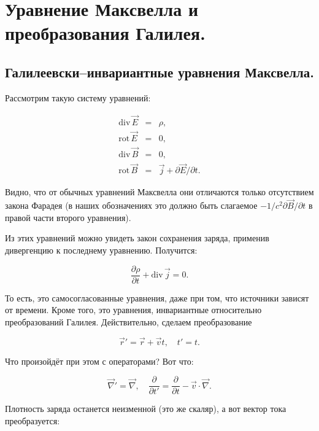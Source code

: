 \documentclass[12pt]{article}
\newcommand{\pt}{\partial}
\newcommand{\rot}{\mathrm{rot}\,}
\renewcommand{\div}{\mathrm{div}\,}
\newcommand{\vn}{\vec{\nabla}}
\begin{document}
\section{Уравнение Максвелла и преобразования Галилея.}
\label{sec:maxwell_galileo}

\subsection{Галилеевски–инвариантные уравнения Максвелла.}
\label{sec:maxwell_inv_gal}

Рассмотрим такую систему уравнений: 

\begin{eqnarray}
  \label{eq:maxwell_cut}
  \div \vec{E} &=& \rho,\\
  \rot \vec{E} &=& 0,\\
  \div \vec{B} &=& 0,\\
  \rot \vec{B} &=& \vec{j} + \pt \vec{E} / \pt t.
\end{eqnarray}

Видно, что от обычных уравнений Максвелла они отличаются только
отсутствием закона Фарадея (в наших обозначениях это должно быть
слагаемое $-1/c^2 \pt \vec{B} / \pt t$ в правой части второго
уравнения). 

Из этих уравнений можно увидеть закон сохранения заряда, применив
дивергенцию к последнему уравнению. Получится: 

\begin{equation}
  \label{eq:conserv_charge}
  \frac{\pt \rho}{\pt t} + \div \vec{j} =0.
\end{equation}

То есть, это самосогласованные уравнения, даже при том, что источники
зависят от времени. Кроме того, это уравнения, инвариантные
относительно преобразований Галилея. Действительно, сделаем
преобразование

\begin{equation}
  \label{eq:galileo_transf}
  \vec{r}' = \vec{r} + \vec{v} t, \quad t'=t.
\end{equation}

Что произойдёт при этом с операторами? Вот что: 

\begin{equation}
  \label{eq:operators_transf}
  \vn ' = \vn, \quad \frac{\pt}{\pt t'} = \frac{\pt}{\pt t} -
  \vec{v}\cdot \vn.
\end{equation}

Плотность заряда останется неизменной (это же скаляр), а вот вектор
тока преобразуется: 
\end{document}
